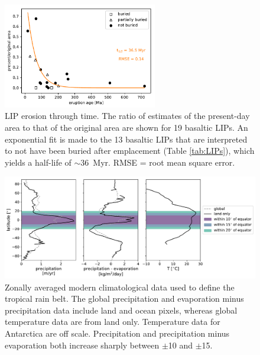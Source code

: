 \documentclass[11pt,letterpaper]{article}
\begin{document}
\begin{figure}[h!]
\begin{center}
	\includegraphics[width=0.6\textwidth]{Manuscript/Figures/LIP_Preservation.pdf}
	\caption{LIP erosion through time. The ratio of estimates of the present-day area to that of the original area are shown for 19 basaltic LIPs. An exponential fit is made to the 13 basaltic LIPs that are interpreted to not have been buried after emplacement (Table \ref{tab:LIPs}), which yields a half-life of $\sim$36~Myr. RMSE = root mean square error.}
	\label{fig:LIP_preservation}
\end{center}
\end{figure}

\begin{figure}[h!]
\begin{center}
	\includegraphics[width=\textwidth]{Manuscript/Figures/Climatology.pdf}
	\caption{Zonally averaged modern climatological data used to define the tropical rain belt. The global precipitation \citep{Kalnay1996a} and evaporation minus precipitation \citep{Trenberth2011a} data include land and ocean pixels, whereas global temperature \citep{Kalnay1996a} data are from land only. Temperature data for Antarctica are off scale. Precipitation and precipitation minus evaporation both increase sharply between $\pm$10\textdegree\xspace and $\pm$15\textdegree\xspace.}
	\label{fig:Climatology}
\end{center}
\end{figure}
\end{document}
